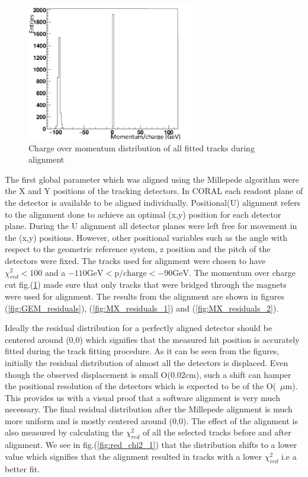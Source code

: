 \begin{figure}[t!]
\centering
\includegraphics[width=0.65\textwidth]{thesis_figures/alignment/cop.png}
\caption{Charge over momentum distribution of all fitted tracks during alignment}
\label{fig:cop}
\end{figure}

The first global parameter which was aligned using the Millepede algorithm were the X and Y positions of the tracking detectors. In CORAL each readout plane of the detector is available to be aligned individually.
Positional(U) alignment refers to the alignment done to achieve an optimal (x,y) position for each detector plane. During the U alignment all detector planes were left free for movement in the (x,y) positions. However, other positional variables such as the angle with respect to the geometric reference system, z position and the pitch of the detectors were fixed. The tracks used for alignment were chosen to have $\chi^2_{red} < 100$ and a $-110 \text{GeV} <\text{p/charge}< -90 \text{GeV}$. The momentum over charge cut fig.(\ref{fig:cop}) made sure that only tracks that were bridged through the magnets were used for alignment. The results from the alignment are shown in figures (\ref{fig:GEM_residuals}), (\ref{fig:MX_residuals_1}) and (\ref{fig:MX_residuals_2}).

Ideally the residual distribution for a perfectly aligned detector should be centered around (0,0) which signifies that the measured hit position is accurately fitted during the track fitting procedure. As it can be seen from the figures, initially the residual distribution of almost all the detectors is displaced. Even though the observed displacement is small O(0.02cm), such a shift can hamper the positional resolution of the detectors which is expected to be of the O(~$\mu$m). This provides us with a visual proof that a software alignment is very much necessary. The final residual distribution after the Millepede alignment is much more uniform and is mostly centered around (0,0). The effect of the alignment is also measured by calculating the $\chi_{red}^2$ of all the selected tracks before and after alignment. We see in fig.(\ref{fig:red_chi2_1}) that the distribution shifts to a lower value which signifies that the alignment resulted in tracks with a lower $\chi_{red}^2$ i.e a better fit.

